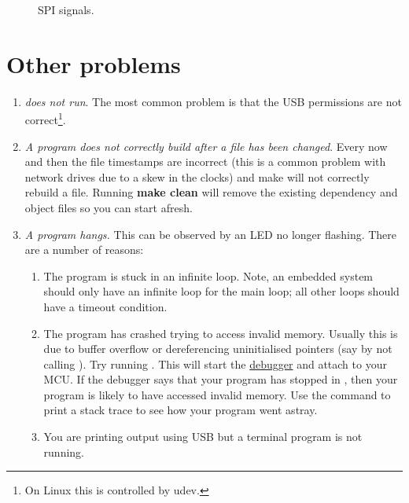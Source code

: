 \begin{figure}[!h]
  \centering
  \caption{SPI signals.}
\end{figure}



\section{Other problems}
\label{faq}

\begin{enumerate}
\item
  \emph{ does not run}. The most common problem is
  that the USB permissions are not correct\footnote{On Linux this is
    controlled by udev.}.

\item
  \emph{A program does not correctly build after a file has been
    changed}. Every now and then the file timestamps are incorrect
  (this is a common problem with network drives due to a skew in the
  clocks) and make will not correctly rebuild a file. Running
  \textbf{make clean} will remove the existing dependency and object
  files so you can start afresh.

\item
  \emph{A program hangs.} This can be observed by an LED no longer
  flashing. There are a number of reasons:

  \begin{enumerate}
  \item
    The program is stuck in an infinite loop. Note, an embedded system
    should only have an infinite loop for the main loop; all other loops
    should have a timeout condition.
  \item
    The program has crashed trying to access invalid memory. Usually
    this is due to buffer overflow or dereferencing uninitialised
    pointers (say by not calling ). Try running
    .  This will start the
    \protect\hyperref[debugging]{debugger} and attach to your MCU. If
    the debugger says that your program has stopped in
    , then your program is likely to have
    accessed invalid memory. Use the  command to print a
    stack trace to see how your program went astray.

  \item You are printing output using USB but a terminal program is
    not running.
  \end{enumerate}


\end{enumerate}
